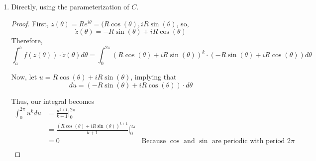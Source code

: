 \documentclass[11pt]{article}
\begin{document}
\begin{enumerate}
\begin{enumerate}
\begin{proof}
				\bigskip
				
				In conclusion, because $z^k$ is an entire function (and the derivative of an analytic function for $z \neq 1$) and $C$ is a smooth, closed curve, then by the Closed Curve Theorem, $\int_C z^k dz = 0$ for $z \neq 1$.
			\end{proof}
			
			\item Directly, using the parameterization of $C$.
			\begin{proof}
				First, $z(\theta) = Re^{i\theta} = (R\cos(\theta), iR\sin(\theta)$, so, \[\dot{z}(\theta) = -R\sin(\theta) + iR\cos(\theta)\]
				Therefore,
				\[\int^b_a f(z(\theta)) \cdot \dot{z}(\theta) d\theta =
				  \int^{2\pi}_{0} (R\cos(\theta) + iR\sin(\theta))^k \cdot 
				  (-R\sin(\theta) + iR\cos(\theta))
				  d\theta\]
				  
				Now, let $u = R\cos(\theta) + iR\sin(\theta)$, implying that
				\[du = (-R\sin(\theta) + iR\cos(\theta))\cdot d\theta\]
				
				Thus, our integral becomes
				\[\begin{aligned}
				\int^{2\pi}_{0} u^k du
				&= \frac{u^{k+1}}{k+1}|^{2\pi}_{0} \\
				&= \frac{(R\cos(\theta) + iR\sin(\theta))^{k+1}}{k+1} |^{2\pi}_{0} \\
				&= 0 & \text{Because $\cos$ and $\sin$ are periodic with period 2$\pi$}\\
				\end{aligned}\]
			\end{proof}
		\end{enumerate}
\end{enumerate}
\end{document}
